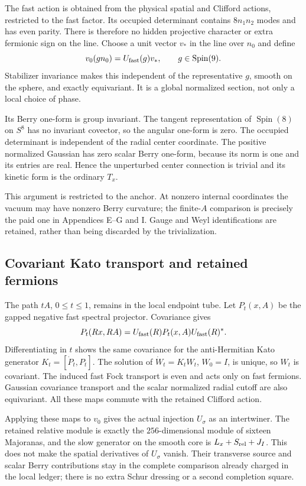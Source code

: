 The fast action is obtained from the physical spatial and Clifford actions, restricted to the fast factor. Its occupied determinant contains $8n_1n_2$ modes and has even parity. There is therefore no hidden projective character or extra fermionic sign on the line. Choose a unit vector $v_*$ in the line over $n_0$ and define
\begin{equation}
 v_0(gn_0)=U_{\rm fast}(g)v_*,\qquad g\in\operatorname{Spin}(9).
\end{equation}
Stabilizer invariance makes this independent of the representative $g$, smooth on the sphere, and exactly equivariant. It is a global normalized section, not only a local choice of phase.

Its Berry one-form is group invariant. The tangent representation of $\operatorname{Spin}(8)$ on $S^8$ has no invariant covector, so the angular one-form is zero. The occupied determinant is independent of the radial center coordinate. The positive normalized Gaussian has zero scalar Berry one-form, because its norm is one and its entries are real. Hence the unperturbed center connection is trivial and its kinetic form is the ordinary $T_x$.

This argument is restricted to the anchor. At nonzero internal coordinates the vacuum may have nonzero Berry curvature; the finite-$A$ comparison is precisely the paid one in Appendices E--G and I. Gauge and Weyl identifications are retained, rather than being discarded by the trivialization.

\subsection{Covariant Kato transport and retained fermions}
The path $tA$, $0\le t\le1$, remains in the local endpoint tube. Let $P_t(x,A)$ be the gapped negative fast spectral projector. Covariance gives
\begin{equation}
 P_t(Rx,RA)=U_{\rm fast}(R)P_t(x,A)U_{\rm fast}(R)^*.
\end{equation}
Differentiating in $t$ shows the same covariance for the anti-Hermitian Kato generator $K_t=[\dot P_t,P_t]$. The solution of $\dot W_t=K_tW_t$, $W_0=I$, is unique, so $W_t$ is covariant. The induced fast Fock transport is even and acts only on fast fermions. Gaussian covariance transport and the scalar normalized radial cutoff are also equivariant. All these maps commute with the retained Clifford action.

Applying these maps to $v_0$ gives the actual injection $U_\sigma$ as an intertwiner. The retained relative module is exactly the $256$-dimensional module of sixteen Majoranas, and the slow generator on the smooth core is
$L_x+S_{\rm rel}+J_I$. This does not make the spatial derivatives of $U_\sigma$ vanish. Their transverse source and scalar Berry contributions stay in the complete comparison already charged in the local ledger; there is no extra Schur dressing or a second completion square.

